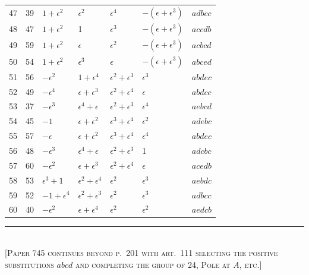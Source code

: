 \documentclass[11pt,a4paper]{article}
\begin{document}
\begin{center}
\begin{longtable}{r|r|l|l|l|l|l}
47 & 39 & $1 + \epsilon^{2}$ & $\epsilon^{2}$ & $\epsilon^{4}$
                                     & $-(\epsilon + \epsilon^{3})$ & $adbcc$\\
48 & 47 & $1 + \epsilon^{2}$ & 1 & $\epsilon^{3}$
                                     & $-(\epsilon + \epsilon^{3})$ & $accdb$\\
49 & 59 & $1 + \epsilon^{2}$ & $\epsilon$ & $\epsilon^{2}$
                                     & $-(\epsilon + \epsilon^{3})$ & $acbcd$\\
50 & 54 & $1 + \epsilon^{2}$ & $\epsilon^{3}$ & $\epsilon$
                                     & $-(\epsilon + \epsilon^{3})$ & $abced$\\
51 & 56 & $-\epsilon^{2}$ & $1 + \epsilon^{4}$ & $\epsilon^{2} + \epsilon^{3}$
                                     & $\epsilon^{3}$ & $abdec$\\
52 & 49 & $-\epsilon^{4}$ & $\epsilon + \epsilon^{3}$ & $\epsilon^{2} + \epsilon^{4}$
                                     & $\epsilon$ & $abdcc$\\
53 & 37 & $-\epsilon^{3}$ & $\epsilon^{4} + \epsilon$ & $\epsilon^{2} + \epsilon^{3}$
                                     & $\epsilon^{4}$ & $aebcd$\\
54 & 45 & $-1$ & $\epsilon + \epsilon^{2}$ & $\epsilon^{3} + \epsilon^{4}$
                                     & $\epsilon^{2}$ & $adebc$\\
55 & 57 & $-\epsilon$ & $\epsilon + \epsilon^{2}$ & $\epsilon^{3} + \epsilon^{4}$
                                     & $\epsilon^{4}$ & $abdec$\\
56 & 48 & $-\epsilon^{3}$ & $\epsilon^{4} + \epsilon$ & $\epsilon^{2} + \epsilon^{3}$
                                     & 1 & $adcbc$\\
57 & 60 & $-\epsilon^{2}$ & $\epsilon + \epsilon^{3}$ & $\epsilon^{2} + \epsilon^{4}$
                                     & $\epsilon$ & $acedb$\\
58 & 53 & $\epsilon^{3} + 1$ & $\epsilon^{2} + \epsilon^{4}$ & $\epsilon^{2}$
                                     & $\epsilon^{3}$ & $aebdc$\\
59 & 52 & $-1 + \epsilon^{4}$ & $\epsilon^{2} + \epsilon^{3}$ & $\epsilon^{2}$
                                     & $\epsilon^{3}$ & $adbcc$\\
60 & 40 & $-\epsilon^{2}$ & $\epsilon + \epsilon^{4}$ & $\epsilon^{2}$
                                     & $\epsilon^{2}$ & $aedcb$\\
\end{longtable}
\normalsize
\end{center}

\bigskip
\noindent\rule{0.35\textwidth}{0.4pt}\\[2pt]
\footnotesize\textsc{[Paper 745 continues beyond p.~201 with art.\ 111
selecting the positive substitutions $abcd$ and completing the group of 24,
Pole at $A$, etc.]}\normalsize
\end{document}

